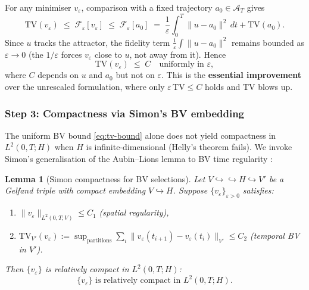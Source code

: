 \documentclass[12pt,a4paper]{article}
\theoremstyle{definition}
\theoremstyle{plain}
\newtheorem{lemma}[definition]{Lemma}
\theoremstyle{remark}
\begin{document}
For any minimiser $v_\varepsilon$, comparison with a fixed trajectory $a_0 \in \mathcal{A}_T$ gives
\begin{equation}\label{eq:apriori}
  \mathrm{TV}(v_\varepsilon) \;\leq\; \mathcal{F}_\varepsilon[v_\varepsilon] \;\leq\; \mathcal{F}_\varepsilon[a_0] \;=\; \frac{1}{\varepsilon}\int_0^T \|u - a_0\|^2\,dt + \mathrm{TV}(a_0).
\end{equation}
Since $u$ tracks the attractor, the fidelity term $\frac{1}{\varepsilon}\int\|u-a_0\|^2$ remains bounded as $\varepsilon \to 0$ (the $1/\varepsilon$ forces $v_\varepsilon$ close to $u$, not away from it). Hence
\begin{equation}\label{eq:tv-bound}
  \mathrm{TV}(v_\varepsilon) \;\leq\; C \quad \text{uniformly in } \varepsilon,
\end{equation}
where $C$ depends on $u$ and $a_0$ but not on $\varepsilon$. This is the \textbf{essential improvement} over the unrescaled formulation, where only $\varepsilon\,\mathrm{TV} \leq C$ holds and TV blows up.

\subsubsection*{Step 3: Compactness via Simon's BV embedding}

The uniform BV bound \eqref{eq:tv-bound} alone does not yield compactness in $L^2(0,T;H)$ when $H$ is infinite-dimensional (Helly's theorem fails). We invoke Simon's generalisation of the Aubin--Lions lemma to BV time regularity \cite{Simon1987}:

\begin{lemma}[Simon compactness for BV selections]\label{lem:simon-bv}
Let $V \hookrightarrow\!\!\!\hookrightarrow H \hookrightarrow V'$ be a Gelfand triple with compact embedding $V \hookrightarrow H$. Suppose $\{v_\varepsilon\}_{\varepsilon > 0}$ satisfies:
\begin{enumerate}
\item[\textup{(S1)}] $\|v_\varepsilon\|_{L^2(0,T;V)} \leq C_1$ \quad (spatial regularity),
\item[\textup{(S2)}] $\mathrm{TV}_{V'}(v_\varepsilon) := \sup_{\text{partitions}} \sum_i \|v_\varepsilon(t_{i+1}) - v_\varepsilon(t_i)\|_{V'} \leq C_2$ \quad (temporal BV in $V'$).
\end{enumerate}
Then $\{v_\varepsilon\}$ is relatively compact in $L^2(0,T;H)$:
\begin{equation}\label{eq:aubin-lions}
  \{v_\varepsilon\} \text{ is relatively compact in } L^2(0,T;H).
\end{equation}
\end{lemma}
\end{document}
